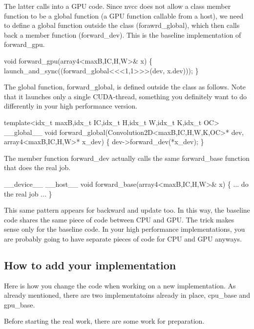 The latter calls into a G\+PU code. Since nvcc does not allow a class member function to be a global function (a G\+PU function callable from a host), we need to define a global function outside the class (forawrd\+\_\+global), which then calls back a member function (forward\+\_\+dev). This is the baseline implementation of forward\+\_\+gpu.


\begin{DoxyCode}
void forward\_gpu(array4<maxB,IC,H,W>& x) \{
  launch\_and\_sync((forward\_global<<<1,1>>>(dev, x.dev)));
\}
\end{DoxyCode}


The global function, forward\+\_\+global, is defined outside the class as follows. Note that it launches only a single C\+U\+D\+A-\/thread, something you definitely want to do differently in your high performance version.


\begin{DoxyCode}
template<idx\_t maxB,idx\_t IC,idx\_t H,idx\_t W,idx\_t K,idx\_t OC>
\_\_global\_\_ void forward\_global(Convolution2D<maxB,IC,H,W,K,OC>* dev,
                               array4<maxB,IC,H,W>* x\_dev) \{
  dev->forward\_dev(*x\_dev);
\}
\end{DoxyCode}


The member function forward\+\_\+dev actually calls the same forward\+\_\+base function that does the real job.


\begin{DoxyCode}
\_\_device\_\_ \_\_host\_\_ 
void forward\_base(array4<maxB,IC,H,W>& x) \{
  ... do the real job ...
\}
\end{DoxyCode}


This same pattern appears for backward and update too. In this way, the baseline code shares the same piece of code between C\+PU and G\+PU. The trick makes sense only for the baseline code. In your high performance implementations, you are probably going to have separate pieces of code for C\+PU and G\+PU anyways.

\subsection*{How to add your implementation }

Here is how you change the code when working on a new implementation. As already mentioned, there are two implementatoins already in place, cpu\+\_\+base and gpu\+\_\+base.

Before starting the real work, there are some work for preparation.


